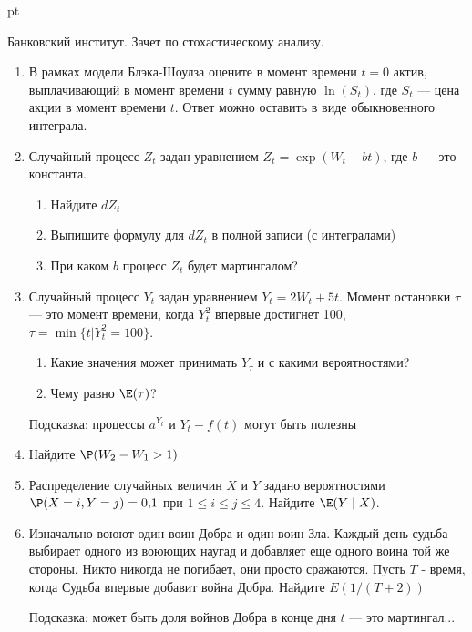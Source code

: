 \documentclass[pdftex,12pt,a4paper]{article}
\begin{document}
 pt %


Банковский институт. Зачет по стохастическому анализу.

\begin{enumerate}
\item В рамках модели Блэка-Шоулза оцените в момент времени $t=0$ актив, выплачивающий в момент времени $t$ сумму равную $\ln(S_t)$, где $S_t$ --- цена акции в момент времени $t$. Ответ можно оставить в виде обыкновенного интеграла.
\item Случайный процесс $Z_t$ задан уравнением $Z_t=\exp(W_t+bt)$, где $b$ --- это константа. 
\begin{enumerate}
\item Найдите $dZ_t$
\item Выпишите формулу для $dZ_t$ в полной записи (с интегралами)
\item При каком $b$ процесс $Z_t$ будет мартингалом?
\end{enumerate}
\item Случайный процесс $Y_t$ задан уравнением $Y_t=2W_t+5t$. Момент остановки $\tau$ --- это момент времени, когда $Y_t^2$ впервые достигнет 100, $\tau=\min\{t|Y_t^2=100\}$.
\begin{enumerate}
\item Какие значения может принимать $Y_\tau$ и с какими вероятностями?
\item Чему равно  $\E(\tau)$?
\end{enumerate}
Подсказка: процессы $a^{Y_t}$ и $Y_t-f(t)$ могут быть полезны
\item Найдите $\P(W_2-W_1>1)$
\item Распределение случайных величин $X$ и $Y$ задано вероятностями $\P(X=i,Y=j)=0{,}1$ при $1\leq i \leq j \leq 4$. Найдите $\E(Y\mid X)$. 
\item Изначально воюют один воин Добра и один воин Зла. Каждый день судьба выбирает одного из воюющих наугад и добавляет еще одного воина той же стороны. Никто никогда не погибает, они просто сражаются. Пусть $T$ - время, когда Судьба впервые добавит война Добра.  Найдите $E(1/(T+2)) $


Подсказка: может быть доля войнов Добра в конце дня $ t $ --- это мартингал...

\end{enumerate}
\end{document}
